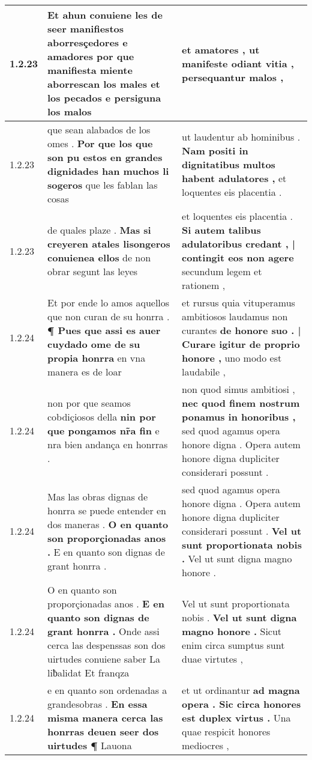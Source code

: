 \begin{tabular}{|p{1cm}|p{6.5cm}|p{6.5cm}|}
1.2.23 & Et ahun conuiene les de seer manifiestos aborresçedores e amadores \textbf{ por que manifiesta miente aborrescan los males et los pecados } e persiguna los malos & et amatores , \textbf{ ut manifeste odiant vitia , } persequantur malos , \\\hline
1.2.23 & que sean alabados de los omes . \textbf{ Por que los que son pu estos en grandes dignidades han muchos li sogeros } que les fablan las cosas & ut laudentur ab hominibus . \textbf{ Nam positi in dignitatibus multos habent adulatores , } et loquentes eis placentia . \\\hline
1.2.23 & de quales plaze . \textbf{ Mas si creyeren atales lisongeros conuienea ellos } de non obrar segunt las leyes & et loquentes eis placentia . \textbf{ Si autem talibus adulatoribus credant , | contingit eos non agere } secundum legem et rationem , \\\hline
1.2.24 & Et por ende lo amos aquellos que non curan de su honrra . \textbf{ ¶ Pues que assi es auer cuydado ome de su propia honrra } en vna manera es de loar & et rursus quia vituperamus ambitiosos laudamus non curantes \textbf{ de honore suo . | Curare igitur de proprio honore , } uno modo est laudabile , \\\hline
1.2.24 & non por que seamos cobdiçiosos della \textbf{ nin por que pongamos nr̃a fin } e nra bien andança en honrras . & non quod simus ambitiosi , \textbf{ nec quod finem nostrum ponamus in honoribus , } sed quod agamus opera honore digna . Opera autem honore digna dupliciter considerari possunt . \\\hline
1.2.24 & Mas las obras dignas de honrra se puede entender en dos maneras . \textbf{ O en quanto son proporçionadas anos . } E en quanto son dignas de grant honrra . & sed quod agamus opera honore digna . Opera autem honore digna dupliciter considerari possunt . \textbf{ Vel ut sunt proportionata nobis . } Vel ut sunt digna magno honore . \\\hline
1.2.24 & O en quanto son proporçionadas anos . \textbf{ E en quanto son dignas de grant honrra . } Onde assi cerca las despenssas son dos uirtudes conuiene saber La liƀalidat Et franqza & Vel ut sunt proportionata nobis . \textbf{ Vel ut sunt digna magno honore . } Sicut enim circa sumptus sunt duae virtutes , \\\hline
1.2.24 & e en quanto son ordenadas a grandesobras . \textbf{ En essa misma manera cerca las honrras deuen seer dos uirtudes ¶ } Lauona & et ut ordinantur \textbf{ ad magna opera . Sic circa honores est duplex virtus . } Una quae respicit honores mediocres , \\\hline

\end{tabular}
